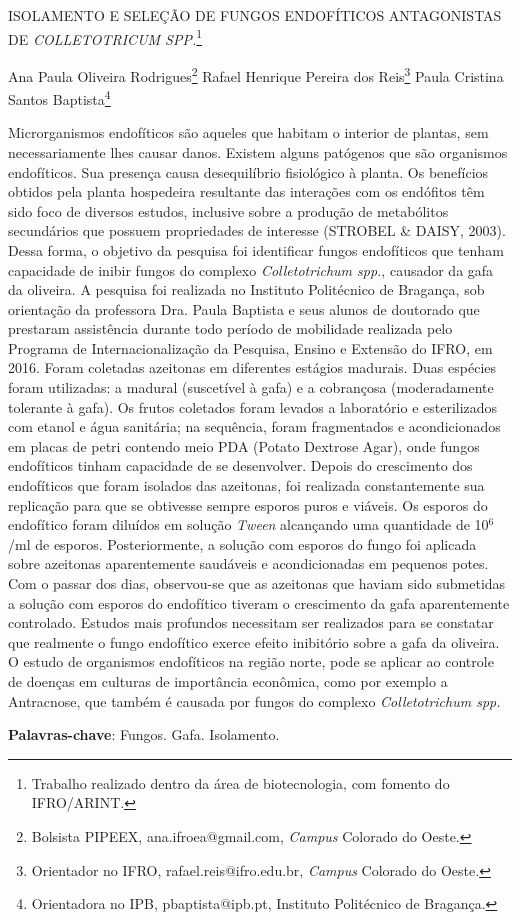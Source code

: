 \documentclass[article,12pt,onesidea,4paper,english,brazil]{abntex2}
\begin{document}
	
	
	\frenchspacing 
	
	\begin{center}
		\LARGE ISOLAMENTO E SELEÇÃO DE FUNGOS ENDOFÍTICOS ANTAGONISTAS DE \textit{COLLETOTRICUM SPP.}\footnote{Trabalho realizado dentro da área de biotecnologia, com fomento do IFRO/ARINT.}
		
		\normalsize
		Ana Paula Oliveira Rodrigues\footnote{Bolsista PIPEEX, ana.ifroea@gmail.com, \textit{Campus} Colorado do Oeste.} 
		Rafael Henrique Pereira dos Reis\footnote{Orientador no IFRO, rafael.reis@ifro.edu.br, \textit{Campus} Colorado do Oeste.} 
		Paula Cristina Santos Baptista\footnote{Orientadora no IPB, pbaptista@ipb.pt, Instituto Politécnico de Bragança.} 
	\end{center}
	
	\noindent Microrganismos endofíticos são aqueles que habitam o interior de plantas, sem necessariamente lhes causar danos. Existem alguns patógenos que são organismos endofíticos. 
	Sua presença causa desequilíbrio fisiológico à planta. Os benefícios
	obtidos pela planta hospedeira resultante das interações com os endófitos têm sido
	foco de diversos estudos, inclusive sobre a produção de metabólitos secundários
	que possuem propriedades de interesse (STROBEL \& DAISY, 2003). Dessa forma,
	o objetivo da pesquisa foi identificar fungos endofíticos que tenham capacidade de
	inibir fungos do complexo \textit{Colletotrichum spp.}, causador da gafa da oliveira. 
	A pesquisa foi realizada no Instituto Politécnico de Bragança, sob orientação da
	professora Dra. Paula Baptista e seus alunos de doutorado que prestaram
	assistência durante todo período de mobilidade realizada pelo Programa de
	Internacionalização da Pesquisa, Ensino e Extensão do IFRO, em 2016. Foram
	coletadas azeitonas em diferentes estágios madurais. Duas espécies foram
	utilizadas: a madural (suscetível à gafa) e a cobrançosa (moderadamente tolerante à
	gafa). Os frutos coletados foram levados a laboratório e esterilizados com etanol e
	água sanitária; na sequência, foram fragmentados e acondicionados em placas de
	petri contendo meio PDA (Potato Dextrose Agar), onde fungos endofíticos tinham
	capacidade de se desenvolver. Depois do crescimento dos endofíticos que foram
	isolados das azeitonas, foi realizada constantemente sua replicação para que se
	obtivesse sempre esporos puros e viáveis. Os esporos do endofítico foram diluídos
	em solução \textit{Tween} alcançando uma quantidade de 10$^6$/ml de esporos.
	Posteriormente, a solução com esporos do fungo foi aplicada sobre azeitonas
	aparentemente saudáveis e acondicionadas em pequenos potes. Com o passar dos
	dias, observou-se que as azeitonas que haviam sido submetidas a solução com
	esporos do endofítico tiveram o crescimento da gafa aparentemente controlado.
	Estudos mais profundos necessitam ser realizados para se constatar que realmente
	o fungo endofítico exerce efeito inibitório sobre a gafa da oliveira. O estudo de
	organismos endofíticos na região norte, pode se aplicar ao controle de doenças em
	culturas de importância econômica, como por exemplo a Antracnose, que também é
	causada por fungos do complexo \textit{Colletotrichum spp.}
	
	\vspace{\onelineskip}
	
	\noindent
	\textbf{Palavras-chave}: Fungos. Gafa. Isolamento.
	
\end{document}

